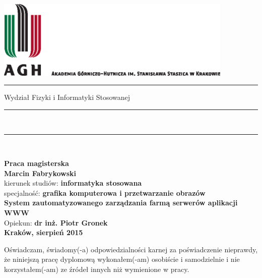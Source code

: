\thispagestyle{empty}
\includegraphics[height=37.5mm]{agh_nzw_a_pl_1w_wbr_cmyk.eps}\\
\rule{30mm}{0pt}
{\large\textsf{Wydział Fizyki i Informatyki Stosowanej}}\\
\rule{\textwidth}{3pt}\\
\rule[2ex]
{\textwidth}{1pt}\\
\vspace{7ex}
\begin{center}
{\bf\LARGE\textsf{Praca magisterska}}\\
\vspace{13ex}
{\bf\Large\textsf{Marcin Fabrykowski}}\\
\vspace{3ex}
{\sf \small kierunek studiów:} {\bf\small\textsf{informatyka stosowana}}\\
{\sf \small specjalność:} {\bf\small\textsf{grafika komputerowa i przetwarzanie obrazów}}\\
\vspace{15ex}
{\bf\huge\textsf{System zautomatyzowanego zarządzania farmą serwerów aplikacji WWW}}\\
\vspace{14ex}
{\sf \Large Opiekun:} {\bf\Large\textsf{dr inż. Piotr Gronek}}\\
\vspace{22ex}
\textsf{\bf\large\textsf{Kraków, sierpień 2015}}
\end{center}

\newpage

{\sf Oświadczam, świadomy(-a) odpowiedzialności karnej za poświadczenie nieprawdy, że niniejszą pracę dyplomową wykonałem(-am) osobiście i samodzielnie i nie korzystałem(-am) ze źródeł innych niż wymienione w pracy.}

\vspace{14ex}

